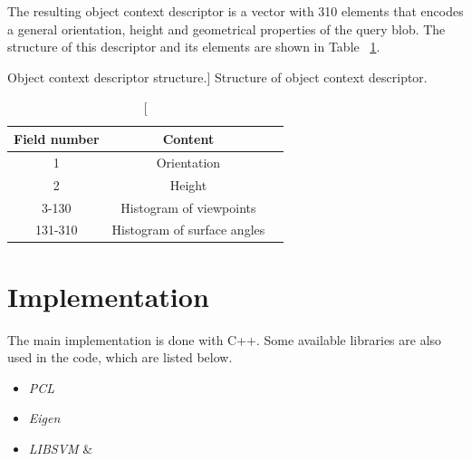 


The resulting object context descriptor is a vector with 310 elements that encodes a general orientation, height and
geometrical properties of the query blob.
The structure of this descriptor and its elements are shown in Table ~\ref{Descriptor.table}.

\begin{table}
\centering
\caption
[Object context descriptor structure.]
{Structure of object context descriptor.}
\label{Descriptor.table}
\begin{tabular}{|c|c|c|}
\hline
Field number & Content\\

\hline

1 & Orientation\\

\hline

2 & Height\\

\hline

3-130 & Histogram of viewpoints \\

\hline

131-310 &  Histogram of surface angles\\

\hline

\end{tabular}
\end{table}

% 
% 


\section{Implementation}

The main implementation is done with C++. Some available libraries are also used in the code, which are listed below.      

\begin{itemize}
 \item {\it PCL} \cite{Rusu_ICRA2011_PCL}
 \item {\it Eigen} \cite{eigenweb}
 \item {\it LIBSVM} \cite{LIBSVM} \& \cite{li2010holistic}
\end{itemize}

